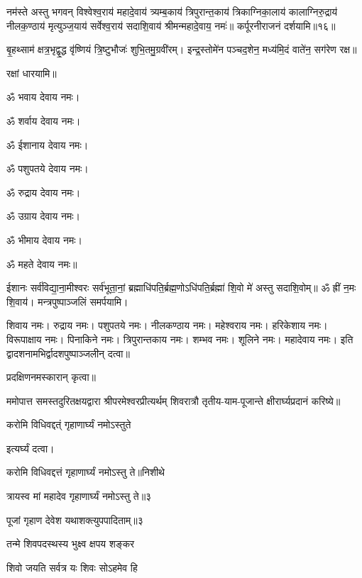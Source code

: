 नम॑स्ते अस्तु भगवन् विश्वेश्व॒राय॑ महादे॒वाय॑ त्र्यम्ब॒काय॑ त्रिपुरान्त॒काय॑ त्रिकाग्निका॒लाय॑ कालाग्निरु॒द्राय॑ नीलक॒ण्ठाय॑ मृत्युञ्ज॒याय॑ सर्वेश्व॒राय॑ सदाशि॒वाय॑ श्रीमन्महादे॒वाय॒ नमः॑॥ कर्पूरनीराजनं दर्शयामि॥१६॥

बृ॒हथ्साम॑ क्षत्र॒भृद्वृ॒द्ध वृ॑ष्णियं त्रि॒ष्टुभौजः॑ शुभि॒तमु॒ग्रवी॑रम्।
इन्द्र॒स्तोमे॑न पञ्चद॒शेन॒ मध्य॑मि॒दं वाते॑न॒ सग॑रेण रक्ष॥

रक्षां धारयामि॥

ॐ भवाय देवाय नमः। 

ॐ शर्वाय देवाय नमः। 

ॐ ईशानाय देवाय नमः। 

ॐ पशुपतये देवाय नमः। 

ॐ रुद्राय देवाय नमः। 

ॐ उग्राय देवाय नमः। 

ॐ भीमाय देवाय नमः। 

ॐ महते देवाय नमः॥


ईशानः सर्व॑विद्या॒ना॒मीश्वरः सर्व॑भूता॒नां॒ ब्रह्माधि॑पति॒र्ब्रह्म॒णो\-ऽधि॑पति॒र्ब्रह्मा॑ शि॒वो मे॑ अस्तु सदाशि॒वोम्॥ ॐ ह्रीं न॒मः शि॒वाय॑। मन्त्रपुष्पाञ्जलिं समर्पयामि।   


शिवाय नमः। रुद्राय नमः। पशुपतये नमः। नीलकण्ठाय नमः। महेश्वराय नमः। हरिकेशाय नमः। विरूपाक्षाय नमः। पिनाकिने नमः। त्रिपुरान्तकाय नमः। शम्भव नमः। शूलिने नमः। महादेवाय नमः। इति द्वादशनामभिर्द्वादशपुष्पाञ्जलीन् दत्वा॥

प्रदक्षिणनमस्कारान् कृत्वा॥

ममोपात्त समस्तदुरितक्षयद्वारा श्रीपरमेश्वरप्रीत्यर्थम् शिवरात्रौ तृतीय-याम-पूजान्ते क्षीरार्घ्यप्रदानं करिष्ये॥

{करोमि विधिवद्दत्ं गृहाणार्घ्यं नमोऽस्तुते}

इत्यर्घ्यं दत्वा।
\medskip

{करोमि विधिवद्दत्तं गृहाणार्घ्यं नमोऽस्तु ते॥निशीथे}

{त्रायस्व मां महादेव गृहाणार्घ्यं नमोऽस्तु ते॥३} 



{पूजां गृहाण देवेश यथाशक्त्युपपादिताम्॥३}


{तन्मे शिवपदस्थस्य भुक्ष्व क्षपय शङ्कर}

{शिवो जयति सर्वत्र यः शिवः सोऽहमेव हि}

